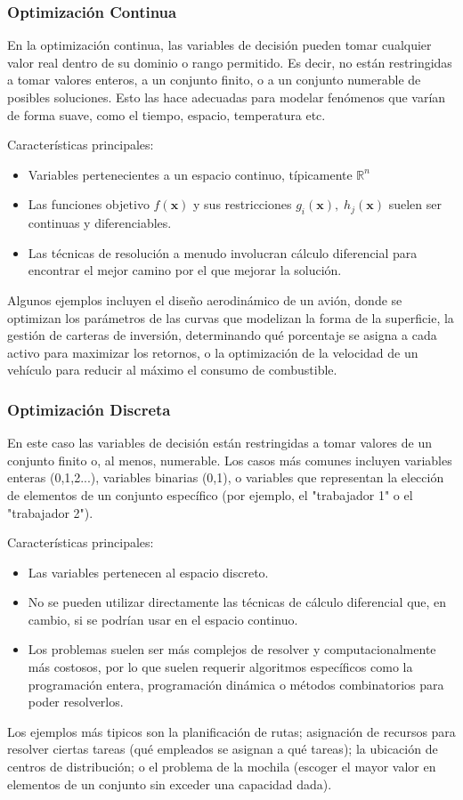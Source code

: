 \documentclass[12pt,a4paper]{book}
\begin{document}
\subsubsection{Optimización Continua}
En la optimización continua, las variables de decisión pueden tomar cualquier valor real dentro de su dominio o rango permitido. Es decir, no están restringidas a tomar valores enteros, a un conjunto finito, o a un conjunto numerable de posibles soluciones. Esto las hace adecuadas para modelar fenómenos que varían de forma suave, como el tiempo, espacio, temperatura etc.

Características principales:
\begin{itemize}
    \item Variables pertenecientes a un espacio continuo, típicamente $\mathbb{R}^n$
    \item Las funciones objetivo $f(\mathbf{x})$ y sus restricciones $g_i(\mathbf{x}), \;h_j(\mathbf{x})$ suelen ser continuas y diferenciables.
    \item Las técnicas de resolución a menudo involucran cálculo diferencial para encontrar el mejor camino por el que mejorar la solución.
\end{itemize}
Algunos ejemplos incluyen el diseño aerodinámico de un avión, donde se optimizan los parámetros de las curvas que modelizan la forma de la superficie, la gestión de carteras de inversión, determinando qué porcentaje se asigna a cada activo para maximizar los retornos, o la optimización de la velocidad de un vehículo para reducir al máximo el consumo de combustible.

\subsubsection{Optimización Discreta}
En este caso las variables de decisión están restringidas a tomar valores de un conjunto finito o, al menos, numerable. Los casos más comunes incluyen variables enteras (0,1,2...), variables binarias (0,1), o variables que representan la elección de elementos de un conjunto específico (por ejemplo, el "trabajador 1" o el "trabajador 2").

Características principales:
\begin{itemize}
    \item Las variables pertenecen al espacio discreto.
    \item No se pueden utilizar directamente las técnicas de cálculo diferencial que, en cambio, si se podrían usar en el espacio continuo.
    \item Los problemas suelen ser más complejos de resolver y computacionalmente más costosos, por lo que suelen requerir algoritmos específicos como la programación entera, programación dinámica o métodos combinatorios para poder resolverlos.
\end{itemize}
Los ejemplos más tipicos son la planificación de rutas; asignación de recursos para resolver ciertas tareas (qué empleados se asignan a qué tareas); la ubicación de centros de distribución; o el problema de la mochila (escoger el mayor valor en elementos de un conjunto sin exceder una capacidad dada).
\end{document}
